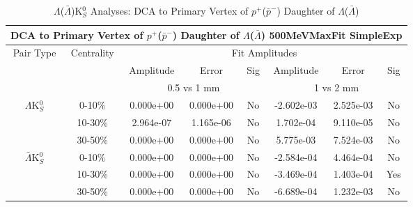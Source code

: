 \documentclass[../AnalysisNoteJBuxton.tex]{subfiles}
\begin{document}
\begin{table}
 \centering
 \begin{tabular}{|c|c|c|c|c||c|c|c|}
  \multicolumn{8}{c}{DCA to Primary Vertex of $p^{+}$($\bar{p}^{-}$) Daughter of $\Lambda$($\bar{\Lambda}$) 500MeVMaxFit SimpleExp} \\
  \hline
  \multirow{3}{*}{Pair Type} & \multirow{3}{*}{Centrality} & \multicolumn{6}{c|}{Fit Amplitudes} \\
  \cline{3-8}
   & & Amplitude & Error & Sig & Amplitude & Error & Sig \\  
  \cline{3-8}
   & & \multicolumn{3}{c||}{0.5 vs 1 mm} & \multicolumn{3}{c|}{1 vs 2 mm} \\  
  \hline  
  \multirow{3}{*}{$\Lambda$K$^{0}_{S}$}  
   &  0-10\% & 0.000e+00 & 0.000e+00 & No & -2.602e-03 & 2.525e-03 & No \\
   & 10-30\% & 2.964e-07 & 1.165e-06 & No & 1.702e-04 & 9.110e-05 & No \\
   & 30-50\% & 0.000e+00 & 0.000e+00 & No & 5.775e-03 & 7.524e-03 & No \\
  \hline  
  \multirow{3}{*}{$\bar{\Lambda}$K$^{0}_{S}$}  
   &  0-10\% & 0.000e+00 & 0.000e+00 & No & -2.584e-04 & 4.464e-04 & No \\
   & 10-30\% & 0.000e+00 & 0.000e+00 & No & -3.469e-04 & 1.403e-04 & Yes \\
   & 30-50\% & 0.000e+00 & 0.000e+00 & No & -6.689e-04 & 1.232e-03 & No \\
  \hline
 \end{tabular}
 \caption{$\Lambda$($\bar{\Lambda}$)K$^{0}_{S}$ Analyses: DCA to Primary Vertex of $p^{+}$($\bar{p}^{-}$) Daughter of $\Lambda$($\bar{\Lambda}$)}
 \label{tab:DcaToPrimVertexProtonDaughtOfLamLamK0_500MeVMaxFit_SimpleExp}
\end{table}



\clearpage
\end{document}
